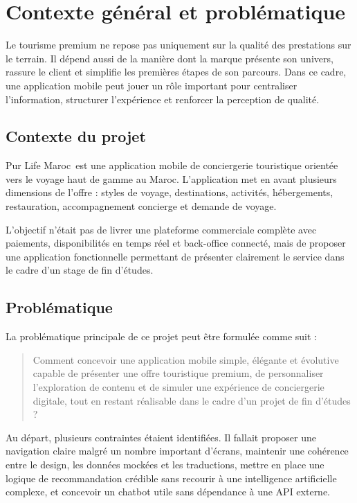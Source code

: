 \documentclass[12pt,a4paper]{report}
\newcommand{\ShortProjectName}{Pur Life Maroc}
\begin{document}
\chapter{Contexte général et problématique}

Le tourisme premium ne repose pas uniquement sur la qualité des prestations sur le terrain. Il dépend aussi de la manière dont la marque présente son univers, rassure le client et simplifie les premières étapes de son parcours. Dans ce cadre, une application mobile peut jouer un rôle important pour centraliser l'information, structurer l'expérience et renforcer la perception de qualité.

\section{Contexte du projet}

\ShortProjectName\ est une application mobile de conciergerie touristique orientée vers le voyage haut de gamme au Maroc. L'application met en avant plusieurs dimensions de l'offre : styles de voyage, destinations, activités, hébergements, restauration, accompagnement concierge et demande de voyage.

L'objectif n'était pas de livrer une plateforme commerciale complète avec paiements, disponibilités en temps réel et back-office connecté, mais de proposer une application fonctionnelle permettant de présenter clairement le service dans le cadre d'un stage de fin d'études.

\section{Problématique}

La problématique principale de ce projet peut être formulée comme suit :

\begin{quote}
Comment concevoir une application mobile simple, élégante et évolutive capable de présenter une offre touristique premium, de personnaliser l'exploration de contenu et de simuler une expérience de conciergerie digitale, tout en restant réalisable dans le cadre d'un projet de fin d'études ?
\end{quote}

Au départ, plusieurs contraintes étaient identifiées. Il fallait proposer une navigation claire malgré un nombre important d'écrans, maintenir une cohérence entre le design, les données mockées et les traductions, mettre en place une logique de recommandation crédible sans recourir à une intelligence artificielle complexe, et concevoir un chatbot utile sans dépendance à une API externe.
\end{document}
